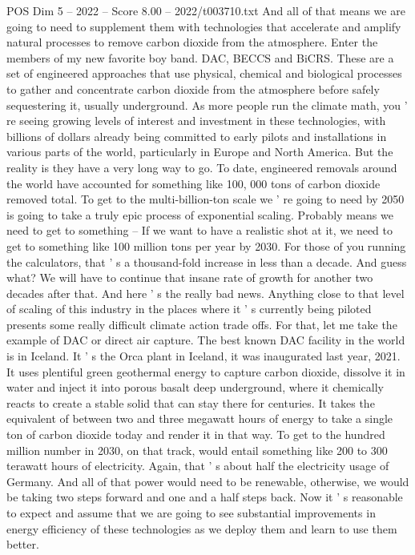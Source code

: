 \begin{textsample}{POS Dim 5 – 2022 – Score 8.00 – 2022/t003710.txt}
And all of that means we are going to need to supplement them with technologies that accelerate and amplify natural processes to remove carbon dioxide from the atmosphere.
Enter the members of my new favorite boy band.
DAC, BECCS and BiCRS.
These are a set of engineered approaches that use physical, chemical and biological processes to gather and concentrate carbon dioxide from the atmosphere before safely sequestering it, usually underground.
As more people run the climate math, you ' re seeing growing levels of interest and investment in these technologies, with billions of dollars already being committed to early pilots and installations in various parts of the world, particularly in Europe and North America.
But the reality is they have a very long way to go.
To date, engineered removals around the world have accounted for something like 100, 000 tons of carbon dioxide removed total.
To get to the multi-billion-ton scale we ' re going to need by 2050 is going to take a truly epic process of exponential scaling.
Probably means we need to get to something -- If we want to have a realistic shot at it, we need to get to something like 100 million tons per year by 2030.
For those of you running the calculators, that ' s a thousand-fold increase in less than a decade.
And guess what?
We will have to continue that insane rate of growth for another two decades after that.
And here ' s the really bad news.
Anything close to that level of scaling of this industry in the places where it ' s currently being piloted presents some really difficult climate action trade offs.
For that, let me take the example of DAC or direct air capture.
The best known DAC facility in the world is in Iceland.
It ' s the Orca plant in Iceland, it was inaugurated last year, 2021.
It uses plentiful green geothermal energy to capture carbon dioxide, dissolve it in water and inject it into porous basalt deep underground, where it chemically reacts to create a stable solid that can stay there for centuries.
It takes the equivalent of between two and three megawatt hours of energy to take a single ton of carbon dioxide today and render it in that way.
To get to the hundred million number in 2030, on that track, would entail something like 200 to 300 terawatt hours of electricity.
Again, that ' s about half the electricity usage of Germany.
And all of that power would need to be renewable, otherwise, we would be taking two steps forward and one and a half steps back.
Now it ' s reasonable to expect and assume that we are going to see substantial improvements in energy efficiency of these technologies as we deploy them and learn to use them better.

\end{textsample}

